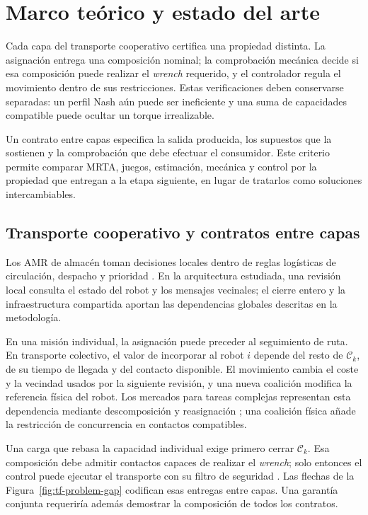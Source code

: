 \section{Marco teórico y estado del arte}
\label{sec:theoretical-framework}

Cada capa del transporte cooperativo certifica una propiedad distinta. La asignación entrega una composición nominal; la comprobación mecánica decide si esa composición puede realizar el \emph{wrench} requerido, y el controlador regula el movimiento dentro de sus restricciones. Estas verificaciones deben conservarse separadas: un perfil Nash aún puede ser ineficiente y una suma de capacidades compatible puede ocultar un torque irrealizable.

Un contrato entre capas especifica la salida producida, los supuestos que la sostienen y la comprobación que debe efectuar el consumidor. Este criterio permite comparar MRTA, juegos, estimación, mecánica y control por la propiedad que entregan a la etapa siguiente, en lugar de tratarlos como soluciones intercambiables.

\subsection{Transporte cooperativo y contratos entre capas}
\label{subsec:tf-amr-transport}

Los AMR de almacén toman decisiones locales dentro de reglas logísticas de circulación, despacho y prioridad \parencite{azadeh2019warehouse}. En la arquitectura estudiada, una revisión local consulta el estado del robot y los mensajes vecinales; el cierre entero y la infraestructura compartida aportan las dependencias globales descritas en la metodología.

En una misión individual, la asignación puede preceder al seguimiento de ruta. En transporte colectivo, el valor de incorporar al robot \(i\) depende del resto de \(\mathcal C_k\), de su tiempo de llegada y del contacto disponible. El movimiento cambia el coste y la vecindad usados por la siguiente revisión, y una nueva coalición modifica la referencia física del robot. Los mercados para tareas complejas representan esta dependencia mediante descomposición y reasignación \parencite{zlotStentz2006ComplexTasks}; una coalición física añade la restricción de concurrencia en contactos compatibles.

Una carga que rebasa la capacidad individual exige primero cerrar \(\mathcal C_k\). Esa composición debe admitir contactos capaces de realizar el \emph{wrench}; solo entonces el control puede ejecutar el transporte con su filtro de seguridad \parencite{an2023cooperativeReview}. Las flechas de la Figura~\ref{fig:tf-problem-gap} codifican esas entregas entre capas. Una garantía conjunta requeriría además demostrar la composición de todos los contratos.

